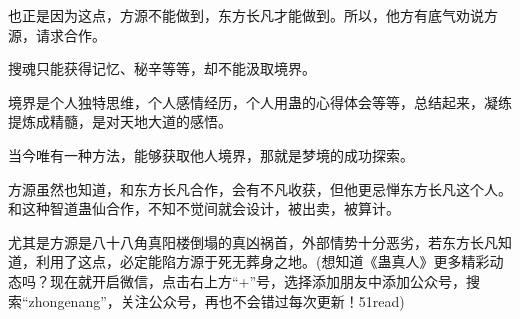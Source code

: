 \begin{this_body}
也正是因为这点，方源不能做到，东方长凡才能做到。所以，他方有底气劝说方源，请求合作。

搜魂只能获得记忆、秘辛等等，却不能汲取境界。

境界是个人独特思维，个人感情经历，个人用蛊的心得体会等等，总结起来，凝练提炼成精髓，是对天地大道的感悟。

当今唯有一种方法，能够获取他人境界，那就是梦境的成功探索。

方源虽然也知道，和东方长凡合作，会有不凡收获，但他更忌惮东方长凡这个人。和这种智道蛊仙合作，不知不觉间就会设计，被出卖，被算计。

尤其是方源是八十八角真阳楼倒塌的真凶祸首，外部情势十分恶劣，若东方长凡知道，利用了这点，必定能陷方源于死无葬身之地。(想知道《蛊真人》更多精彩动态吗？现在就开启微信，点击右上方“+”号，选择添加朋友中添加公众号，搜索“zhongenang”，关注公众号，再也不会错过每次更新！51read)

\end{this_body}

